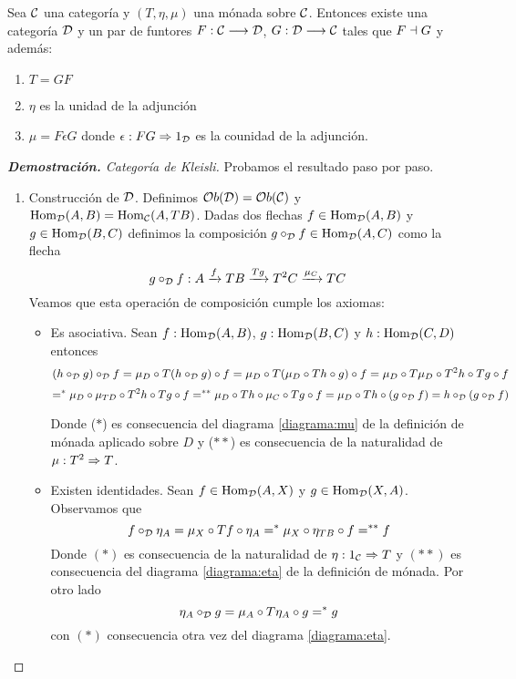 \begin{theorem}
  Sea $\mathcal{C}$ una categoría y $(T, \eta, \mu)$ una mónada
  sobre $\mathcal{C}$. Entonces existe una categoría $\mathcal{D}$ y un par
  de funtores $F : \mathcal{C}\longrightarrow \mathcal{D}$, $G : \mathcal{D}\longrightarrow \mathcal{C}$ tales
  que $F \dashv G$ y además:
  \begin{enumerate}
  \item $T = GF$
  \item $\eta$ es la unidad de la adjunción
  \item $\mu = F\epsilon G$ donde $\epsilon: FG\Rightarrow 1_{\mathcal{D}}$ es
    la counidad de la adjunción.
  \end{enumerate}
\end{theorem}
\begin{proof}[\textbf{Demostración. } Categoría de Kleisli]
  Probamos el resultado paso por paso.
  \begin{enumerate}
  \item Construcción de $\mathcal{D}$. Definimos $\mathcal{O}b(\mathcal{D}) = \mathcal{O}b(\mathcal{C})$ y
    $\operatorname{Hom}_{\mathcal{D}}(A, B) = \operatorname{Hom}_{\mathcal{C}}(A, TB)$.
    Dadas dos flechas $f \in \operatorname{Hom}_{\mathcal{D}}(A, B)$ y
    $g \in \operatorname{Hom}_{\mathcal{D}}(B, C)$ definimos la composición $g \circ_{\mathcal{D}} f \in \operatorname{Hom}_{\mathcal{D}}(A, C)$
    como la flecha
    $$g \circ_{\mathcal{D}} f :
    A \xrightarrow{f} TB \xrightarrow{Tg} T^2 C \xrightarrow{\mu_C} T C
    $$
    Veamos que esta operación de composición
    cumple los axiomas:
    \begin{itemize}
    \item Es asociativa. Sean $f : \operatorname{Hom}_{\mathcal{D}}(A, B)$, $g : \operatorname{Hom}_{\mathcal{D}}(B, C)$
      y $h : \operatorname{Hom}_{\mathcal{D}}(C, D)$ entonces
      $$(h \circ_{\mathcal{D}} g) \circ_{\mathcal{D}} f = \mu_D \circ T(h \circ_{\mathcal{D}} g) \circ f
      = \mu_D \circ T(\mu_D \circ Th \circ g) \circ f
      = \mu_D \circ T\mu_D \circ T^2h \circ Tg \circ f$$
      $$=^* \mu_D \circ \mu_{TD} \circ T^2h \circ Tg \circ f
      =^{**}\mu_D \circ Th \circ \mu_C \circ Tg \circ f
      =\mu_D \circ Th \circ (g \circ_{\mathcal{D}} f)
      = h \circ_{\mathcal{D}} (g \circ_{\mathcal{D}} f)$$

      Donde ($*$) es consecuencia del diagrama \eqref{diagrama:mu}
      de la definición de mónada aplicado sobre $D$ y ($**$) es
      consecuencia de la naturalidad de $\mu : T^2\Rightarrow T$.

    \item Existen identidades. Sean
      $f \in \operatorname{Hom}_{\mathcal{D}}(A, X)$ y $g \in \operatorname{Hom}_{\mathcal{D}}(X, A)$. Observamos
      que
      $$f \circ_{\mathcal{D}} \eta_A = \mu_X \circ Tf \circ \eta_A
      =^* \mu_X \circ \eta_{TB} \circ f
      =^{**} f$$
    Donde $(*)$ es consecuencia de la naturalidad de
    $\eta : 1_{\mathcal{C}}\Rightarrow T$ y $(**)$ es consecuencia
    del diagrama \eqref{diagrama:eta} de la definición de mónada.
    Por otro lado
    $$\eta_A \circ_{\mathcal{D}} g = \mu_A \circ T\eta_A \circ g
    =^* g$$
    con $(*)$ consecuencia otra vez del diagrama \eqref{diagrama:eta}.


\end{itemize}
\end{enumerate}
\end{proof}
